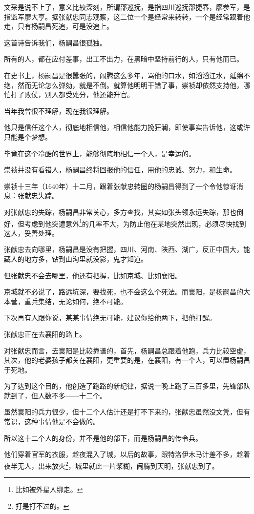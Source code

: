 \begin{multicols}{\theparacolNo}
文采是说不上了，意义比较深刻，所谓邵巡抚，是指四川巡抚邵捷春，廖参军，是指监军廖大亨。据张献忠同志观察，这二位一个是经常来转转，一个是经常跟着他走，只有杨嗣昌死追，可是没追上。

这首诗告诉我们，杨嗣昌很孤独。

所有的人，都在应付差事，出工不出力，在黑暗中坚持前行的人，只有他而已。

在史书上，杨嗣昌是很嚣张的，闹腾这么多年，骂他的口水，如滔滔江水，延绵不绝，然而无论怎么弹劾，就是不倒。就算他明明干错了事，崇祯却依然支持他，哪怕打了败仗，别人都受处分，他还能升官。

当年我曾很不理解，现在我很理解。

他只是信任这个人，彻底地相信他，相信他能力挽狂澜，即使事实告诉他，这或许只能是个梦想。

毕竟在这个冷酷的世界上，能够彻底地相信一个人，是幸运的。

崇祯并没有看错人，杨嗣昌终将回报他的信任，用他的忠诚、努力，和生命。

崇祯十三年（1640年）十二月，跟着张献忠转圈的杨嗣昌得到了一个令他惊讶消息：张献忠失踪。

对张献忠的失踪，杨嗣昌非常关心，多方查找，其实如张头领永远失踪，那也倒好，但考虑到他突遭意外\footnote{比如被外星人绑走。}的几率不大，为防止他在某地突然出现，必须尽快找到这人，妥善处理。

张献忠去向哪里，杨嗣昌是没有把握，四川、河南、陕西、湖广，反正中国大，能藏人的地方多，钻到山沟里就没影，鬼才知道。

但张献忠不会去哪里，他还有把握，比如京城、比如襄阳。

京城就不必说了，路远坑深，要找死，也不会这么个死法。而襄阳，是杨嗣昌的大本营，重兵集结，无论如何，绝不可能。

下次再有人跟你说，某某事情绝无可能，建议你给他两下，把他打醒。

张献忠正在去襄阳的路上。

对张献忠而言，去襄阳是比较靠谱的，首先，杨嗣昌总跟着他跑，兵力比较空虚，其次，他的老婆孩子都关在襄阳，更重要的是，在襄阳，有一个人，可以置杨嗣昌于死地。

为了达到这个目的，他创造了跑路的新纪律，据说一晚上跑了三百多里，先锋部队就到了，但人数不多——十二个。

虽然襄阳的兵力很少，但十二个人估计还是打不下来的，张献忠虽然没文凭，但有常识，这种事情他是不会做的。

所以这十二个人的身份，并不是他的部下，而是杨嗣昌的传令兵。

他们穿着官军的衣服，趁夜混入了城，以后的故事，跟特洛伊木马计差不多，趁着夜半无人，出来放火\footnote{打是打不过的。}，城里就此一片浆糊，闹腾到天明，张献忠到了。


\end{multicols}
